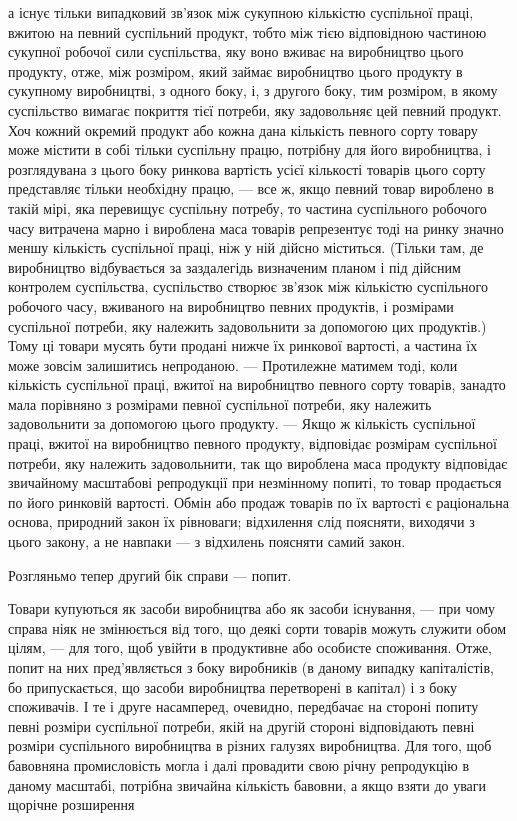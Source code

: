 \parcont{}  %
а існує тільки випадковий зв’язок між сукупною кількістю суспільної
праці, вжитою на певний суспільний продукт, тобто між
тією відповідною частиною сукупної робочої сили суспільства,
яку воно вживає на виробництво цього продукту, отже, між
розміром, який займає виробництво цього продукту в сукупному
виробництві, з одного боку, і, з другого боку, тим розміром, в якому
суспільство вимагає покриття тієї потреби, яку задовольняє цей
певний продукт. Хоч кожний окремий продукт або кожна дана кількість
певного сорту товару може містити в собі тільки суспільну
працю, потрібну для його виробництва, і розглядувана з цього
боку ринкова вартість усієї кількості товарів цього сорту представляє
тільки необхідну працю, — все ж, якщо певний товар
вироблено в такій мірі, яка перевищує суспільну потребу, то
частина суспільного робочого часу витрачена марно і вироблена
маса товарів репрезентує тоді на ринку значно меншу
кількість суспільної праці, ніж у ній дійсно міститься. (Тільки
там, де виробництво відбувається за заздалегідь визначеним
планом і під дійсним контролем суспільства, суспільство створює
зв’язок між кількістю суспільного робочого часу, вживаного на виробництво
певних продуктів, і розмірами суспільної потреби, яку
належить задовольнити за допомогою цих продуктів.) Тому ці товари
мусять бути продані нижче їх ринкової вартості, а частина їх
може зовсім залишитись непроданою. — Протилежне матимем тоді,
коли кількість суспільної праці, вжитої на виробництво певного
сорту товарів, занадто мала порівняно з розмірами певної суспільної
потреби, яку належить задовольнити за допомогою цього продукту.
— Якщо ж кількість суспільної праці, вжитої на виробництво
певного продукту, відповідає розмірам суспільної потреби, яку
належить задовольнити, так що вироблена маса продукту відповідає
звичайному масштабові репродукції при незмінному
попиті, то товар продається по його ринковій вартості. Обмін
або продаж товарів по їх вартості є раціональна основа, природний
закон їх рівноваги; відхилення слід поясняти, виходячи
з цього закону, а не навпаки — з відхилень поясняти самий закон.

Розгляньмо тепер другий бік справи — попит.

Товари купуються як засоби виробництва або як засоби
існування, — при чому справа ніяк не змінюється від того, що
деякі сорти товарів можуть служити обом цілям, — для того,
щоб увійти в продуктивне або особисте споживання. Отже,
попит на них пред’являється з боку виробників (в даному випадку
капіталістів, бо припускається, що засоби виробництва
перетворені в капітал) і з боку споживачів. І те і друге насамперед,
очевидно, передбачає на стороні попиту певні розміри
суспільної потреби, якій на другій стороні відповідають певні
розміри суспільного виробництва в різних галузях виробництва.
Для того, щоб бавовняна промисловість могла і далі провадити
свою річну репродукцію в даному масштабі, потрібна звичайна
кількість бавовни, а якщо взяти до уваги щорічне розширення
\parbreak{}  %
